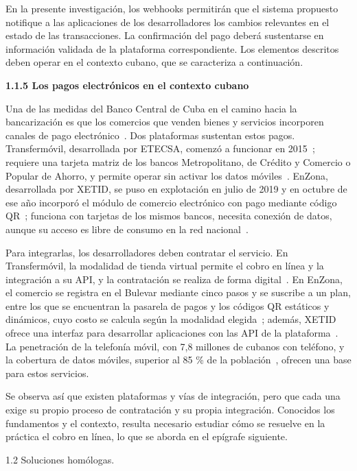 \documentclass[12pt]{article}
\newcommand\doceUnoCinco{\fontsize{12bp}{20.7bp}\selectfont}      %
\newcommand\vacio{\leavevmode\par}
\newcommand\tituloII[1]{%
  \par\vspace{5.65bp}%
  {\parskip=0pt\doceUnoCinco\bfseries
   \leavevmode\phantomsection\addcontentsline{toc}{subsection}{#1}%
   #1\par}%
  \nopagebreak
  \vspace{\dimexpr5.65bp-\parskip\relax}}
\begin{document}
En la presente investigación, los webhooks permitirán que el sistema propuesto notifique a las aplicaciones de los desarrolladores los cambios relevantes en el estado de las transacciones. La confirmación del pago deberá sustentarse en información validada de la plataforma correspondiente. Los elementos descritos deben operar en el contexto cubano, que se caracteriza a continuación.

\vacio
\textbf{1.1.5 Los pagos electrónicos en el contexto cubano}

Una de las medidas del Banco Central de Cuba en el camino hacia la bancarización es que los comercios que venden bienes y servicios incorporen canales de pago electrónico~\cite{granma23}. Dos plataformas sustentan estos pagos. Transfermóvil, desarrollada por ETECSA, comenzó a funcionar en 2015~\cite{etecsa}; requiere una tarjeta matriz de los bancos Metropolitano, de Crédito y Comercio o Popular de Ahorro, y permite operar sin activar los datos móviles~\cite{etecsat}. EnZona, desarrollada por XETID, se puso en explotación en julio de 2019 y en octubre de ese año incorporó el módulo de comercio electrónico con pago mediante código QR~\cite{cubadebate21}; funciona con tarjetas de los mismos bancos, necesita conexión de datos, aunque su acceso es libre de consumo en la red nacional~\cite{xetid,mesa23b}.

Para integrarlas, los desarrolladores deben contratar el servicio. En Transfermóvil, la modalidad de tienda virtual permite el cobro en línea y la integración a su API, y la contratación se realiza de forma digital~\cite{oncuba23}. En EnZona, el comercio se registra en el Bulevar mediante cinco pasos y se suscribe a un plan, entre los que se encuentran la pasarela de pagos y los códigos QR estáticos y dinámicos, cuyo costo se calcula según la modalidad elegida~\cite{granma23}; además, XETID ofrece una interfaz para desarrollar aplicaciones con las API de la plataforma~\cite{xetid}. La penetración de la telefonía móvil, con 7,8 millones de cubanos con teléfono, y la cobertura de datos móviles, superior al 85 \% de la población~\cite{mesa23a}, ofrecen una base para estos servicios.

Se observa así que existen plataformas y vías de integración, pero que cada una exige su propio proceso de contratación y su propia integración. Conocidos los fundamentos y el contexto, resulta necesario estudiar cómo se resuelve en la práctica el cobro en línea, lo que se aborda en el epígrafe siguiente.

\vacio
\tituloII{1.2 Soluciones homólogas.}
\end{document}
